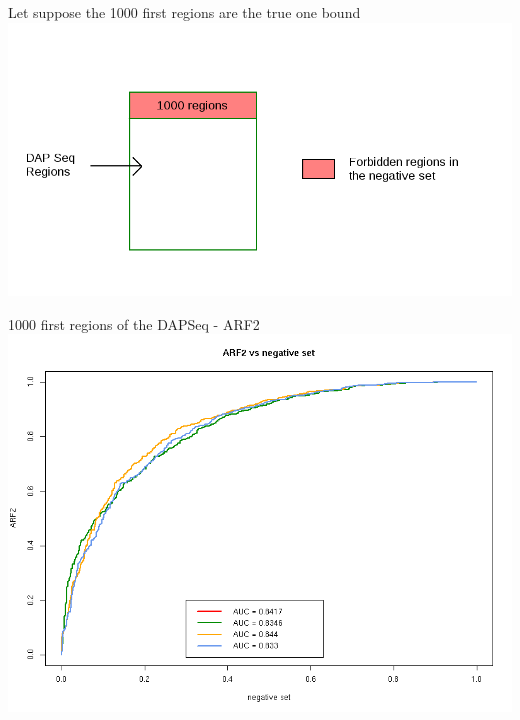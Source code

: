 \documentclass{beamer}
\begin{document}
\begin{frame}{Let suppose the 1000 first regions are the true one bound}
  \includegraphics[width=1\textwidth,height=0.8\textheight,center]{negative_set_1000_regions.png}
\end{frame}


\begin{frame}{1000 first regions of the DAPSeq - ARF2}
  \includegraphics[width=1\textwidth,height=0.8\textheight,center]{ROC_ARF2_negative_set.png}
\end{frame}
\end{document}
